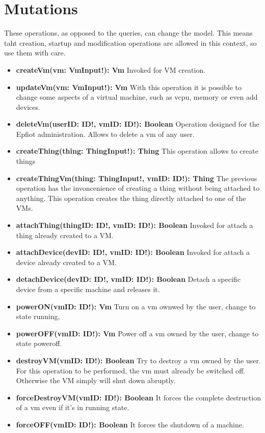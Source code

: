 \newpage
\section{Mutations}
\label{makereference5.3}
These operations, as opposed to the queries, can change the model. This means taht creation, startup and modification operations are allowed in this context, so use them with care.

\begin{itemize}
    \item \textbf{createVm(vm: VmInput!): Vm}\hfill\break
    Invoked for VM creation.
    \item \textbf{updateVm(vm: VmInput!): Vm}\hfill\break
    With this operation it is possible to change some aspects of a virtual machine, such as vcpu, memory or even add devices.
    \item \textbf{deleteVm(userID: ID!, vmID: ID!): Boolean}\hfill\break
    Operation designed for the Epfiot administration. Allows to delete a vm of any user.
    \item \textbf{createThing(thing: ThingInput!): Thing}\hfill\break
    This operation allows to  create things
    \item \textbf{createThingVm(thing: ThingInput!, vmID: ID!): Thing}\hfill\break
    The previous operation has the invoncenience of creating a thing without being attached to anything. This operation creates the thing directly attached to one of the VMs.
    \item \textbf{attachThing(thingID: ID!, vmID: ID!): Boolean}\hfill\break
    Invoked for attach a thing already created to a VM.
    \item \textbf{attachDevice(devID: ID!, vmID: ID!): Boolean}\hfill\break
    Invoked for attach a device already created to a VM.
    \item \textbf{detachDevice(devID: ID!, vmID: ID!): Boolean}\hfill\break
    Detach a specific device from a specific machine and releases it.
    \item \textbf{powerON(vmID: ID!): Vm}\hfill\break
    Turn on a vm ownwed by the user, change to state running,
    \item \textbf{powerOFF(vmID: ID!): Vm}\hfill\break
    Power off a vm owned by the user, change to state poweroff.
    \item \textbf{destroyVM(vmID: ID!): Boolean}\hfill\break
    Try to destroy a vm owned by the user. For this operation to be performed, the vm must already be switched off. Otherwise the VM simply will shut down abruptly.
    \item \textbf{forceDestroyVM(vmID: ID!): Boolean}\hfill\break
    It forces the complete destruction of a vm even if it's in running state.
    \item \textbf{forceOFF(vmID: ID!): Boolean}\hfill\break
    It forces the shutdown of a machine.
    
\end{itemize}